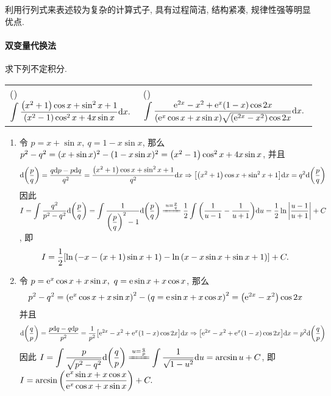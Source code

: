 利用行列式来表述较为复杂的计算式子, 具有过程简洁, 结构紧凑, 规律性强等明显优点.

\paragraph{双变量代换法}

\begin{example}
    求下列不定积分.
    \setcounter{magicrownumbers}{0}
    \begin{table}[H]
        \centering
        \begin{tabular}{l | l}
            (\rownumber{}) $\displaystyle \int\dfrac{\qty(x^2+1)\cos x+\sin^2 x+1}{\qty(x^2-1)\cos^2x+4x\sin x}\dd x.$ & (\rownumber{}) $\displaystyle \int\dfrac{\mathrm{e}^{2x}-x^2+\mathrm{e}^x(1-x)\cos2x}{\qty(\mathrm{e}^x\cos x+x\sin x)\sqrt{\qty(\mathrm{e}^{2x}-x^2)\cos 2x}}\dd x.$
        \end{tabular}
    \end{table}
\end{example}
\begin{solution}
    \begin{enumerate}[label=(\arabic{*})]
        \item 令 $p=x+\sin x,~q=1-x\sin x$, 那么 $p^2-q^2=(x+\sin x)^2-(1-x\sin x)^2=\qty(x^2-1)\cos^2x+4x\sin x$, 并且
              $$\dd\qty(\dfrac{p}{q})=\dfrac{q\dd p-p\dd q}{q^2}=\dfrac{\qty(x^2+1)\cos x+\sin ^2x+1}{q^2}\dd x\Rightarrow \qty[\qty(x^2+1)\cos x+\sin ^2x+1]\dd x=q^2\dd \qty(\dfrac{p}{q})$$
              因此 $I=\displaystyle\int\dfrac{q^2}{p^2-q^2}\dd \qty(\dfrac{p}{q})=\int\dfrac{1}{\qty(\dfrac{p}{q})^2-1}\dd \qty(\dfrac{p}{q})\xlongequal{u=\frac{p}{q}}\dfrac{1}{2}\int\qty(\dfrac{1}{u-1}-\dfrac{1}{u+1})\dd u=\dfrac{1}{2}\ln\qty|\dfrac{u-1}{u+1}|+C$, 
              即 $$I=\dfrac{1}{2}\qty[\ln\qty(-x-(x+1)\sin x+1)-\ln\qty(x-x\sin x+\sin x+1)]+C.$$
        \item 令 $p=\mathrm{e}^x\cos x+x\sin x,~q=\mathrm{e}\sin x+x\cos x$, 那么 $$p^2-q^2=\qty(\mathrm{e}^x\cos x+x\sin x)^2-\qty(q=\mathrm{e}\sin x+x\cos x)^2=\qty(\mathrm{e}^{2x}-x^2)\cos 2x$$
              并且
              $$\dd \qty(\dfrac{q}{p})=\dfrac{p\dd q-q\dd p}{p^2}=\dfrac{1}{p^2}\qty[\mathrm{e}^{2x}-x^2+\mathrm{e}^x(1-x)\cos2x]\dd x\Rightarrow \qty[\mathrm{e}^{2x}-x^2+\mathrm{e}^x(1-x)\cos2x]\dd x=p^2\dd \qty(\dfrac{q}{p})$$
              因此 $\displaystyle I=\int\dfrac{p}{\sqrt{p^2-q^2}}\dd \qty(\dfrac{q}{p})\xlongequal{u=\frac{q}{p}}\int\dfrac{1}{\sqrt{1-u^2}}\dd u=\arcsin u+C$, 即
              $\displaystyle I=\arcsin\qty(\dfrac{\mathrm{e}^x\sin x+x\cos x}{\mathrm{e}^x\cos x+x\sin x})+C.$
    \end{enumerate}
\end{solution}